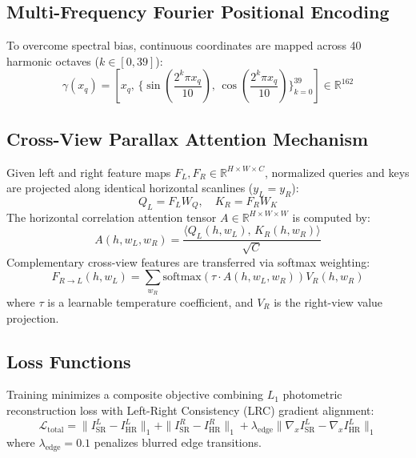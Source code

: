 \documentclass[10pt,journal,compsoc]{IEEEtran}
\begin{document}
\subsection{Multi-Frequency Fourier Positional Encoding}
To overcome spectral bias, continuous coordinates are mapped across 40 harmonic octaves ($k \in [0, 39]$):
\begin{equation}
\gamma(x_q) = \left[ x_q, \, \Big\{ \sin\left(\frac{2^k \pi x_q}{10}\right), \, \cos\left(\frac{2^k \pi x_q}{10}\right) \Big\}_{k=0}^{39} \right] \in \mathbb{R}^{162}
\label{eq:fourier_pos_enc}
\end{equation}

\subsection{Cross-View Parallax Attention Mechanism}
Given left and right feature maps $F_L, F_R \in \mathbb{R}^{H \times W \times C}$, normalized queries and keys are projected along identical horizontal scanlines ($y_L = y_R$):
\begin{equation}
Q_L = F_L W_Q, \quad K_R = F_R W_K
\end{equation}
The horizontal correlation attention tensor $A \in \mathbb{R}^{H \times W \times W}$ is computed by:
\begin{equation}
A(h, w_L, w_R) = \frac{\langle Q_L(h, w_L), \, K_R(h, w_R) \rangle}{\sqrt{C}}
\end{equation}
Complementary cross-view features are transferred via softmax weighting:
\begin{equation}
F_{R \to L}(h, w_L) = \sum_{w_R} \text{softmax}\left( \tau \cdot A(h, w_L, w_R) \right) V_R(h, w_R)
\end{equation}
where $\tau$ is a learnable temperature coefficient, and $V_R$ is the right-view value projection.

\subsection{Loss Functions}
Training minimizes a composite objective combining $L_1$ photometric reconstruction loss with Left-Right Consistency (LRC) gradient alignment:
\begin{equation}
\mathcal{L}_{\text{total}} = \| I_{\text{SR}}^L - I_{\text{HR}}^L \|_1 + \| I_{\text{SR}}^R - I_{\text{HR}}^R \|_1 + \lambda_{\text{edge}} \| \nabla_x I_{\text{SR}}^L - \nabla_x I_{\text{HR}}^L \|_1
\label{eq:loss_func}
\end{equation}
where $\lambda_{\text{edge}} = 0.1$ penalizes blurred edge transitions.
\end{document}
